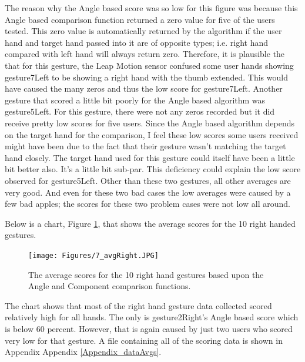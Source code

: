 The reason why the Angle based score was so low for this figure was because this Angle based comparison function returned a zero value for five of the users tested. This zero value is automatically returned by the algorithm if the user hand and target hand passed into it are of opposite types; i.e. right hand compared with left hand will always return zero. Therefore, it is plausible the that for this gesture, the Leap Motion sensor confused some user hands showing gesture7Left to be showing a right hand with the thumb extended. This would have caused the many zeros and thus the low score for gesture7Left. Another gesture that scored a little bit poorly for the Angle based algorithm was gesture5Left. For this gesture, there were not any zeros recorded but it did receive pretty low scores for five users. Since the Angle based algorithm depends on the target hand for the comparison, I feel these low scores some users received might have been due to the fact that their gesture wasn't matching the target hand closely. The target hand used for this gesture could itself have been a little bit better also. It's a little bit sub-par. This deficiency could explain the low score observed for gesture5Left. Other than these two gestures, all other averages are very good. And even for these two bad cases the low averages were caused by a few bad apples; the scores for these two problem cases were not low all around. 

Below is a chart, Figure \ref{fig:rightAvgs}, that shows the average scores for the 10 right handed gestures.
\begin{figure}[H]
\centering
\texttt{[image: Figures/7\_avgRight.JPG]}
\caption[Averages for Right Hand Gestures]{The average scores for the 10 right hand gestures based upon the Angle and Component comparison functions.}
\label{fig:rightAvgs}
\end{figure}
The chart shows that most of the right hand gesture data collected scored relatively high for all hands. The only is gesture2Right's Angle based score which is below 60 percent. However, that is again caused by just two users who scored very low for that gesture. A file containing all of the scoring data is shown in Appendix  Appendix \ref{Appendix_dataAvgs}. 

